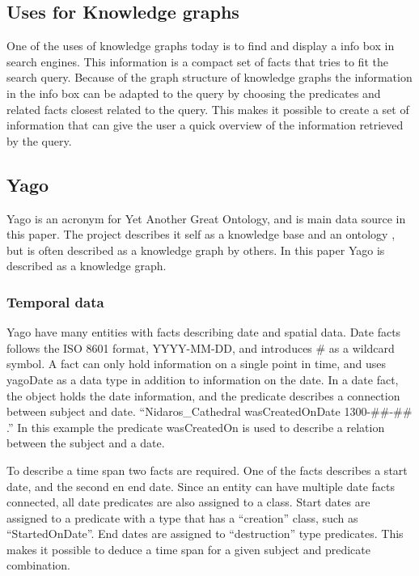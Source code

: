 \subsection{Uses for Knowledge graphs}
One of the uses of knowledge graphs today is to find and display a info box in search engines. This information is a compact set of facts that tries to fit the search query. Because of the graph structure of knowledge graphs the information in the info box can be adapted to the query by choosing the predicates and related facts closest related to the query. This makes it possible to create a set of information that can give the user a quick overview of the information retrieved by the query.

\subsection{Yago}
Yago is an acronym for Yet Another Great Ontology, and is main data source in this paper. The project describes it self as a knowledge base\citep{yago} and an ontology \citep{mahdisoltani:hal-01699874}, but is often described as a knowledge graph by others. In this paper Yago is described as a knowledge graph.

\subsubsection{Temporal data}
Yago have many entities with facts describing date and spatial data.\citep{yago} Date facts follows the ISO 8601 format, YYYY-MM-DD, and introduces \# as a wildcard symbol. A fact can only hold information on a single point in time, and uses yagoDate as a data type in addition to information on the date.\citep{yago} In a date fact, the object holds the date information, and the predicate describes a connection between subject and date. ``Nidaros\_Cathedral wasCreatedOnDate 1300-\#\#-\#\# .'' In this example the predicate wasCreatedOn is used to describe a relation between the subject and a date.

To describe a time span two facts are required. One of the facts describes a start date, and the second en end date. Since an entity can have multiple date facts connected, all date predicates are also assigned to a class. Start dates are assigned to a predicate with a type that has a ``creation'' class, such as ``StartedOnDate''. End dates are assigned to ``destruction'' type predicates. This makes it possible to deduce a time span for a given subject and predicate combination.\citep{yago}

